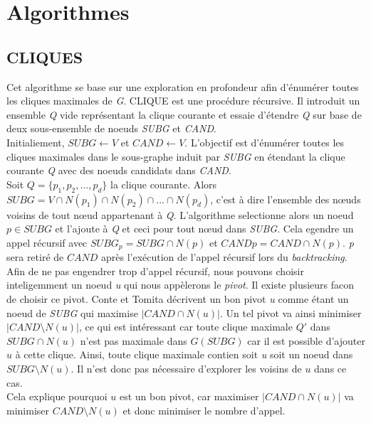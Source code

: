 \documentclass[a4paper, 12pt]{article}
\begin{document}
\section{Algorithmes}

\subsection{CLIQUES}


Cet algorithme se base sur une exploration en profondeur afin d'énumérer toutes les cliques maximales de \emph{G}.
CLIQUE est une procédure récursive. Il introduit un ensemble \emph{Q} vide représentant la clique courante et essaie d'étendre \emph{Q} sur base de deux sous-ensemble de noeuds \textit{SUBG} et \textit{CAND}.\\

Initialiement, $ SUBG \leftarrow V $ et $ CAND \leftarrow V $. L'objectif est d'énumérer toutes les cliques maximales dans le sous-graphe induit par \emph{SUBG} en étendant la clique courante \emph{Q} avec des noeuds candidats dans \emph{CAND}. \\

Soit $ Q = \{p_1, p_2, ..., p_d\} $ la clique courante.
Alors $ SUBG = V \cap N(p_1) \cap N(p_2) \cap ... \cap N(p_d)$, c'est à dire l'ensemble des nœuds voisins de tout
nœud appartenant à \emph{Q}. L'algorithme selectionne alors  un noeud $ p \in SUBG $ et l'ajoute à \emph{Q} et
ceci pour tout nœud dans \emph{SUBG}. Cela egendre un appel récursif avec $ SUBG_p = SUBG \cap N(p) $ et $ CANDp = CAND \cap N(p) $. \emph{p} sera retiré de $ CAND $ après l'exécution de l'appel récursif lors du \textit{backtracking}. \\


Afin de ne pas engendrer trop d'appel récursif, nous pouvons choisir
inteligemment un noeud \textit{u} qui nous appèlerons le \textit{pivot}. Il existe plusieurs facon de choisir
ce pivot. Conte et Tomita\cite{contetomita} décrivent un bon pivot \emph{u} comme étant un noeud de
\emph{SUBG} qui maximise $ | CAND \cap N(u) |$. Un tel pivot va ainsi minimiser $ |CAND \setminus N(u)| $, ce
qui est intéressant car toute clique maximale $ Q' $ dans $ SUBG \cap N(u) $ n'est pas maximale dans
$ G(SUBG) $ car il est possible d'ajouter $ u $ à cette clique. Ainsi, toute clique maximale contien soit
\textit{u} soit un noeud dans $ SUBG \setminus N(u)$. Il n'est donc pas nécessaire d'explorer les voisins de
$ u $ dans ce cas. \\
Cela explique pourquoi $ u $ est un bon pivot, car maximiser $ | CAND \cap N(u) | $ va minimiser
$ CAND \setminus N(u)$ et donc minimiser le nombre d'appel.
\end{document}

